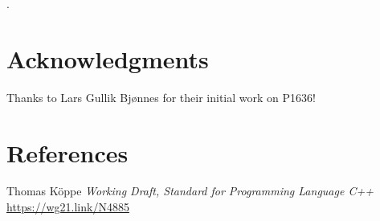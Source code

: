 \documentclass{wg21}
\begin{document}
.

\section{Acknowledgments}

Thanks to Lars Gullik Bjønnes for their initial work on P1636!

\section{References}

\renewcommand{\section}[2]{}%



\begin{thebibliography}{9}


Thomas Köppe
\emph{Working Draft, Standard for Programming Language C++}\newline
\url{https://wg21.link/N4885}


\end{thebibliography}
\end{document}
